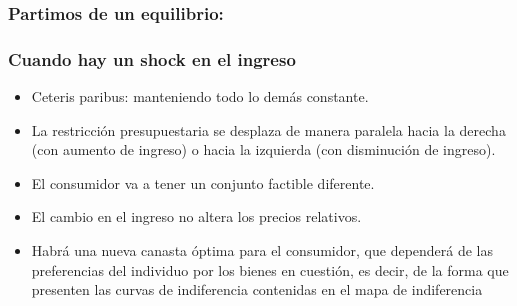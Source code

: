 \documentclass{beamer}
\begin{document}
\begin{frame}
\frametitle{Partimos de un equilibrio:}
\begin{center}
\begin{figure}[H]
\renewcommand{\figurename}{Figure}
\begin{center}
\end{center}
\end{figure}
\end{center}
\end{frame}

\begin{frame}
\frametitle{Cuando hay un shock en el ingreso}
\begin{itemize}
    \item Ceteris paribus: manteniendo todo lo demás constante.
    \item La restricción presupuestaria se desplaza de manera paralela hacia la derecha (con aumento de ingreso) o hacia la izquierda (con disminución de ingreso).
    \item El consumidor va a tener un conjunto factible diferente.
    \item El cambio en el ingreso no altera los precios relativos.
    \item Habrá una nueva canasta óptima para el consumidor, que dependerá de las preferencias del individuo por los bienes en cuestión, es decir, de la forma que presenten las curvas de indiferencia contenidas en el mapa de indiferencia
\end{itemize}
\end{frame}
\end{document}

